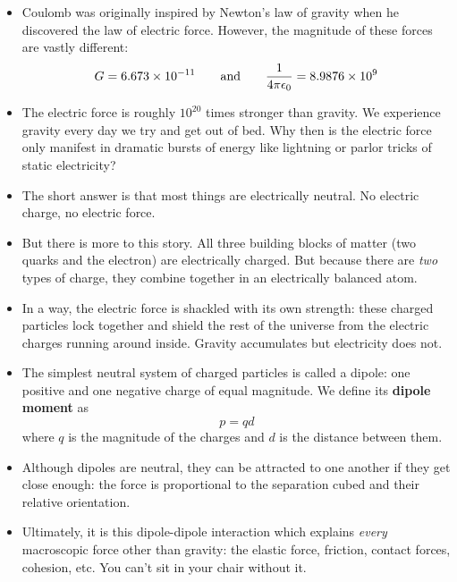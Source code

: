 \documentclass{article}
\begin{document}
%
\begin{itemize}

\item Coulomb was originally inspired by Newton's law of gravity when he discovered the law of electric force. However, the magnitude of these forces are vastly different:
%
\begin{equation*}
G = 6.673 \times 10^{-11} \qquad \text{and} \qquad \frac{1}{4 \pi \epsilon_0} = 8.9876 \times 10^{9}
\end{equation*}
\item The electric force is roughly \(10^{20}\) times stronger than gravity. We experience gravity every day we try and get out of bed. Why then is the electric force only manifest in dramatic bursts of energy like lightning or parlor tricks of static electricity?

\item The short answer is that most things are electrically neutral. No electric charge, no electric force.

\item But there is more to this story. All three building blocks of matter (two quarks and the electron) are electrically charged. But because there are \emph{two} types of charge, they combine together in an electrically balanced atom.

\item In a way, the electric force is shackled with its own strength: these charged particles lock together and shield the rest of the universe from the electric charges running around inside. Gravity accumulates but electricity does not.

\item The simplest neutral system of charged particles is called a dipole: one positive and one negative charge of equal magnitude. We define its \textbf{dipole moment} as
%
\begin{equation*}
p = qd
\end{equation*}
where $q$ is the magnitude of the charges and $d$ is the distance between them.

\item Although dipoles are neutral, they can be attracted to one another if they get close enough: the force is proportional to the separation cubed and their relative orientation.

\item Ultimately, it is this dipole-dipole interaction which explains \emph{every} macroscopic force other than gravity: the elastic force, friction, contact forces, cohesion, etc. You can't sit in your chair without it.

\end{itemize}
\end{document}
